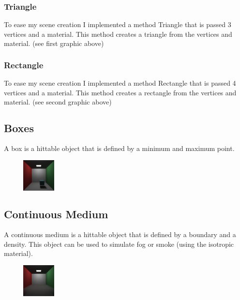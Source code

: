 \documentclass{article}
\begin{document}
        \subsubsection{Triangle}
        To ease my scene creation I implemented a method Triangle that is passed 3 vertices and a material. This method creates a triangle from the vertices and material. (see first graphic above) \par


        \subsubsection{Rectangle}
        To ease my scene creation I implemented a method Rectangle that is passed 4 vertices and a material. This method creates a rectangle from the vertices and material. (see second graphic above) \par
        



    \subsection{Boxes}
    A box is a hittable object that is defined by a minimum and maximum point. \par

    \begin{figure}[h!]
        \centering
        \includegraphics[width=0.15\textwidth]{samples/Box.png}
    \end{figure}


    \subsection{Continuous Medium}
    A continuous medium is a hittable object that is defined by a boundary and a density. This object can be used to simulate fog or smoke (using the isotropic material). \par

    \begin{figure}[h!]
        \centering
        \includegraphics[width=0.15\textwidth]{samples/WeGetItYouVape.png}
    \end{figure}
\end{document}

